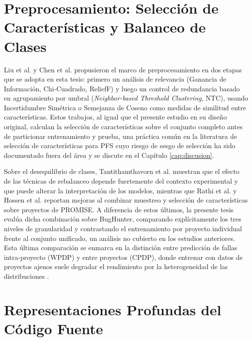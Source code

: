 \section{Preprocesamiento: Selección de Características y Balanceo de Clases}

Liu et al. \cite{liu_empirical_2015} y Chen et al. \cite{chen_empirical_2013} propusieron el marco de preprocesamiento en dos etapas que se adopta en esta tesis: primero un análisis de relevancia (Ganancia de Información, Chi-Cuadrado, ReliefF) y luego un control de redundancia basado en agrupamiento por umbral (\textit{Neighbor-based Threshold Clustering}, NTC), usando Incertidumbre Simétrica \cite{yu2003feature} o Semejanza de Coseno como medidas de similitud entre características. Estos trabajos, al igual que el presente estudio en su diseño original, calculan la selección de características sobre el conjunto completo antes de particionar entrenamiento y prueba, una práctica común en la literatura de selección de características para PFS cuyo riesgo de sesgo de selección ha sido documentado fuera del área \cite{ambroise2002,cawley2010} y se discute en el Capítulo \ref{cap:discusion}.

Sobre el desequilibrio de clases, Tantithamthavorn et al. \cite{8494821} muestran que el efecto de las técnicas de rebalanceo depende fuertemente del contexto experimental y que puede alterar la interpretación de los modelos, mientras que Rathi et al. \cite{rathi_empirical_2023} y Hossen et al. \cite{hossen_hybrid_2020} reportan mejoras al combinar muestreo y selección de características sobre proyectos de PROMISE. A diferencia de estos últimos, la presente tesis evalúa dicha combinación sobre BugHunter, comparando explícitamente los tres niveles de granularidad y contrastando el entrenamiento por proyecto individual frente al conjunto unificado, un análisis no cubierto en los estudios anteriores. Esta última comparación se enmarca en la distinción entre predicción de fallas intra-proyecto (WPDP) y entre proyectos (CPDP), donde entrenar con datos de proyectos ajenos suele degradar el rendimiento por la heterogeneidad de las distribuciones \cite{cheng2022,sharma2023far}.

\section{Representaciones Profundas del Código Fuente}

